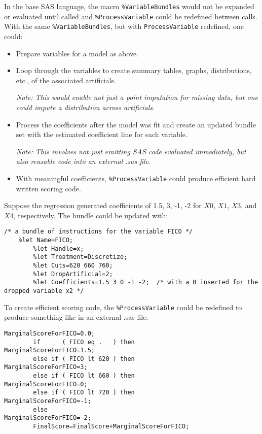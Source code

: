 \documentclass[10pt]{article}
\begin{document}
In the base SAS language, the macro \verb+%VariableBundles+ would
not be expanded or evaluated until called and \verb+%ProcessVariable+ could be redefined between calls. With the same \verb+%VariableBundles+,
but with \verb+ProcessVariable+ redefined, one could:
\begin{itemize}
    \item Prepare variables for a model as above.
    \item Loop through the variables to create summary tables, graphs, distributions, etc., of the associated artificials.\par
            {\em Note: This would enable not just a point imputation for missing data, but one could impute a distribution across artificials.}
    \item Process the coefficients after the model was fit and create an updated bundle set with the estimated coefficient line for each
        variable.\par
        {\em Note: This involves not just emitting SAS code evaluated immediately, but also reusable code into an external .sas file.}
    \item With meaningful coefficients, \verb+%ProcessVariable+ could produce efficient hard written scoring code.
\end{itemize}
Suppose the regression generated coefficients of 1.5, 3, -1, -2 for $X0$, $X1$, $X3$, and $X4$, respectively.  The bundle could be updated with:
\begin{Verbatim}[fontsize=\small,baselinestretch=0.75,formatcom=\color{red}]
    /* a bundle of instructions for the variable FICO */
    %let Name=FICO;
        %let Handle=x;
        %let Treatment=Discretize;
        %let Cuts=620 660 760;
        %let DropArtificial=2;
        %let Coefficients=1.5 3 0 -1 -2;  /* with a 0 inserted for the dropped variable x2 */
\end{Verbatim}
To create efficient scoring code, the \verb+%ProcessVariable+ could be redefined to produce something like in an external .sas file:
\begin{Verbatim}[fontsize=\small,baselinestretch=0.75,formatcom=\color{red}]
        MarginalScoreForFICO=0.0;
        if      ( FICO eq .   ) then            MarginalScoreForFICO=1.5;
        else if ( FICO lt 620 ) then            MarginalScoreForFICO=3;
        else if ( FICO lt 660 ) then            MarginalScoreForFICO=0;
        else if ( FICO lt 720 ) then            MarginalScoreForFICO=-1;
        else                                    MarginalScoreForFICO=-2;
        FinalScore=FinalScore+MarginalScoreForFICO;
\end{Verbatim}
\end{document}
